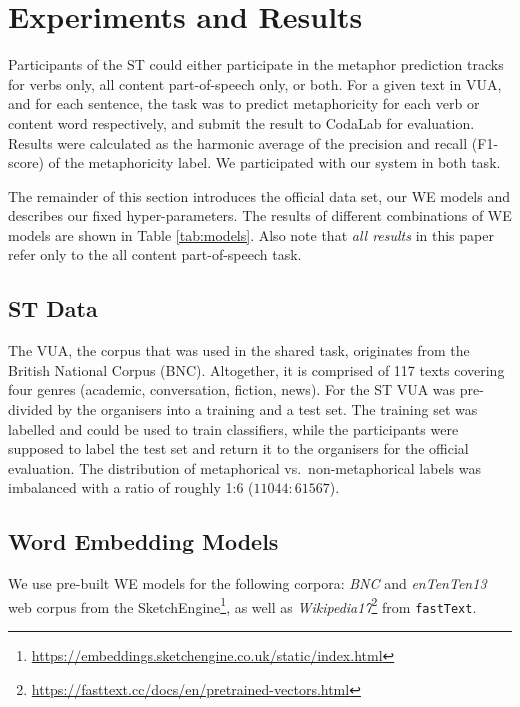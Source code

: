 \documentclass[11pt,a4paper]{article}
\newcommand\fT{\texttt{fastText}\xspace}
\begin{document}
\section{Experiments and Results} %
\label{sec:results}

Participants of the ST could either participate in the metaphor prediction tracks for verbs only, all content part-of-speech only, or both. 
For a given text in VUA, and for each sentence, the task was to predict metaphoricity for each verb or content word respectively, and submit the result to CodaLab for evaluation. 
Results were calculated as the harmonic average of the precision and recall (F1-score) of the metaphoricity label.
We participated with our system in both task.

The remainder of this section introduces the official data set, our WE models and describes our fixed hyper-parameters.
The results of different combinations of WE models are shown in Table \ref{tab:models}. 
Also note that \emph{all results} in this paper refer only to the all content part-of-speech task.


\subsection{ST Data} %

The VUA, the corpus that was used in the shared task, originates from the British National Corpus (BNC). 
Altogether, it is comprised of 117 texts covering four genres (academic, conversation, fiction, news).
For the ST VUA was pre-divided by the organisers into a training and a test set.
The training set was labelled and could be used to train classifiers, while the participants were supposed to label the test set and return it to the organisers for the official evaluation.
The distribution of metaphorical vs.~non-metaphorical labels was imbalanced with a ratio of roughly 1:6 ($11044:61567$).


\subsection{Word Embedding Models}  %

We use pre-built WE models for the following corpora: \emph{BNC} and \emph{enTenTen13} web corpus \cite{1120431} from the SketchEngine\footnote{\url{https://embeddings.sketchengine.co.uk/static/index.html}}, as well as \emph{Wikipedia17}\footnote{\url{https://fasttext.cc/docs/en/pretrained-vectors.html}} from \fT \cite{DBLP:journals/corr/BojanowskiGJM16}. 
\end{document}
